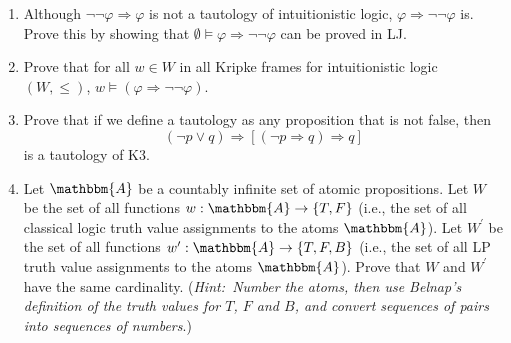 \documentclass[11pt]{article}
\theoremstyle{definition}
\theoremstyle{remark}
\begin{document}
\begin{enumerate}
    \item Although $\neg\neg\varphi\Rightarrow\varphi$ is not a tautology of intuitionistic logic, $\varphi\Rightarrow\neg\neg\varphi$ is. Prove this by showing that $\emptyset\vDash\varphi\Rightarrow\neg\neg\varphi$ can be proved in LJ.

    \item Prove that for all $w\in W$ in all Kripke frames for intuitionistic logic $(W,\leq)$, $w\vDash(\varphi\Rightarrow\neg\neg\varphi)$.

    \item Prove that if we define a tautology as any proposition that is not false, then $$(\neg p \vee q)\Rightarrow [(\neg p\Rightarrow q)\Rightarrow q]$$ is a tautology of K3. 

    \item Let $\mathbbm{A}$ be a countably infinite set of atomic propositions. Let $W$ be the set of all functions $w:\mathbbm{A}\rightarrow\{T,F\}$ (i.e., the set of all classical logic truth value assignments to the atoms $\mathbbm{A}$). Let $W^{\prime}$ be the set of all functions $w^{\prime}:\mathbbm{A}\rightarrow\{T,F,B\}$ (i.e., the set of all LP truth value assignments to the atoms $\mathbbm{A}$). Prove that $W$ and $W^{\prime}$ have the same cardinality. (\textit{Hint:\ Number the atoms, then use Belnap's definition of the truth values for $T$, $F$ and $B$, and convert sequences of pairs into sequences of numbers}.)
\end{enumerate}
\end{document}
